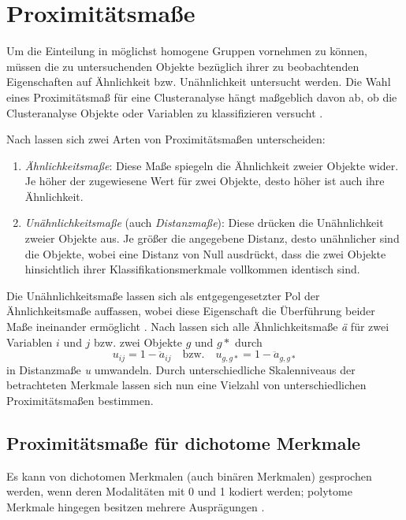 \chapter{Proximitätsmaße}

Um die Einteilung in möglichst homogene Gruppen vornehmen zu können, müssen die zu untersuchenden Objekte bezüglich ihrer zu beobachtenden Eigenschaften auf Ähnlichkeit bzw. Unähnlichkeit untersucht werden. Die Wahl eines Proximitätsmaß für eine Clusteranalyse hängt maßgeblich davon ab, ob die Clusteranalyse Objekte oder Variablen zu klassifizieren versucht \citep[Vgl.][S. 196]{Bacher.2010}.

Nach \citet{Backhaus.2016} lassen sich zwei Arten von Proximitätsmaßen unterscheiden:

\begin{enumerate}
	\item \textit{Ähnlichkeitsmaße}: Diese Maße spiegeln die Ähnlichkeit zweier Objekte wider. Je höher der zugewiesene Wert für zwei Objekte, desto höher ist auch ihre Ähnlichkeit.
	\item \textit{Unähnlichkeitsmaße} (auch \textit{Distanzmaße}): Diese drücken die Unähnlichkeit zweier Objekte aus. Je größer die angegebene Distanz, desto unähnlicher sind die Objekte, wobei eine Distanz von Null ausdrückt, dass die zwei Objekte hinsichtlich ihrer Klassifikationsmerkmale vollkommen identisch sind.
\end{enumerate}
Die Unähnlichkeitsmaße lassen sich als entgegengesetzter Pol der Ähnlichkeitsmaße auffassen, wobei diese Eigenschaft die Überführung beider Maße ineinander ermöglicht \citep[Vgl.][S. 205]{Eckey.2002}. Nach \citet[S. 200]{Bacher.2010} lassen sich alle Ähnlichkeitsmaße \textit{ä} für zwei Variablen $i$ und $j$ bzw. zwei Objekte $g$ und $g*$ durch 
\begin{equation}
u_{ij} = 1 - \ddot{a}_{ij} \quad \text{bzw.} \quad u_{g,g*} = 1- \ddot{a}_{g,g*}
\end{equation}
in Distanzmaße \textit{u} umwandeln. Durch unterschiedliche Skalenniveaus der betrachteten Merkmale lassen sich nun eine Vielzahl von unterschiedlichen Proximitätsmaßen bestimmen.

\section{Proximitätsmaße für dichotome Merkmale}
Es kann von dichotomen Merkmalen (auch binären Merkmalen) gesprochen werden, wenn deren Modalitäten mit 0 und 1 kodiert werden; polytome Merkmale hingegen besitzen mehrere Ausprägungen \citep[Vgl.][S. 218]{Eckey.2002}. 

